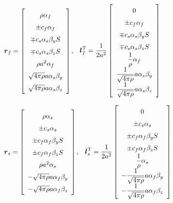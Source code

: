 \begin{center}
$\renewcommand{\arraystretch}{1.5}
\mbox{\boldmath $r$}_{f} =
\left[
\begin{array}{c}
\rho \alpha_{f} \\
\pm c_{f} \alpha_{f} \\
\mp c_{s} \alpha_{s} \beta_{y} S \\
\mp c_{s} \alpha_{s} \beta_{z} S  \\
\rho a^2 \alpha_{f} \\
\sqrt{4\pi\rho} a \alpha_s \beta_y \\
\sqrt{4\pi\rho} a \alpha_s \beta_z \\
\end{array}
\right]$, $\;$
$\renewcommand{\arraystretch}{1.5}
\displaystyle
\mbox{\boldmath $l$}_{f}^{\rm T} =
\frac{1}{2 a^2}
\left[
\begin{array}{c}
0 \\
\pm c_{f} \alpha_{f} \\
\mp c_{s} \alpha_{s} \beta_{y} S \\
\mp c_{s} \alpha_{s} \beta_{z} S  \\
\displaystyle \frac1{\rho} \alpha_{f} \\
\displaystyle \frac1{\sqrt{4\pi\rho}} a \alpha_s \beta_y \\
\displaystyle \frac1{\sqrt{4\pi\rho}} a \alpha_s \beta_z \\
\end{array}
\right]$ 
\end{center}

\begin{center}
$\renewcommand{\arraystretch}{1.5}
\mbox{\boldmath $r$}_{s} =
\left[
\begin{array}{c}
\rho \alpha_{s} \\
\pm c_{s} \alpha_{s} \\
\pm c_{f} \alpha_{f} \beta_{y} S \\
\pm c_{f} \alpha_{f} \beta_{z} S  \\
\rho a^2 \alpha_{s} \\
- \sqrt{4\pi\rho} a \alpha_f \beta_y \\
- \sqrt{4\pi\rho} a \alpha_f \beta_z \\
\end{array}
\right]$, $\;$
$\renewcommand{\arraystretch}{1.5}
\displaystyle
\mbox{\boldmath $l$}_{s}^{\rm T} =
\frac{1}{2 a^2}
\left[
\begin{array}{c}
0 \\
\pm c_{s} \alpha_{s} \\
\pm c_{f} \alpha_{f} \beta_{y} S \\
\pm c_{f} \alpha_{f} \beta_{z} S  \\
\displaystyle \frac1{\rho} \alpha_{s} \\
\displaystyle - \frac1{\sqrt{4\pi\rho}} a \alpha_f \beta_y \\
\displaystyle - \frac1{\sqrt{4\pi\rho}} a \alpha_f \beta_z \\
\end{array}
\right]$ 
\end{center}

